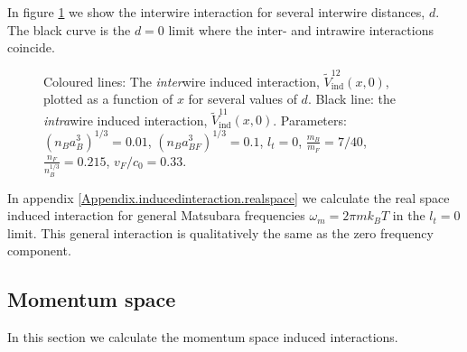 In figure \ref{fig.V12indx} we show the interwire interaction for several interwire distances, $d$. The black curve is the $d = 0$ limit where the inter- and intrawire interactions coincide. 

\begin{figure} 
\begin{center}  
  
\caption{Coloured lines: The \textit{inter}wire induced interaction, $\tilde{V}^{12}_{\text{ind}}(x, 0)$, plotted as a function of $x$ for several values of $d$. Black line: the \textit{intra}wire induced interaction, $\tilde{V}^{11}_{\text{ind}}(x, 0)$. Parameters: $(n_Ba_B^3)^{1/3} = 0.01$, $(n_Ba_{BF}^3)^{1/3} = 0.1$, $l_t = 0$, $\frac{m_B}{m_F} = 7/40$, $\frac{n_F}{n_B^{1/3}} = 0.215$, $v_F/c_0 = 0.33$.}  
\label{fig.V12indx}  
\end{center}    
\end{figure}

In appendix \ref{Appendix.inducedinteraction.realspace} we calculate the real space induced interaction for general Matsubara frequencies $\omega_m = 2\pi m k_BT$ in the $l_t = 0$ limit. This general interaction is qualitatively the same as the zero frequency component.  

\subsection{Momentum space}
\label{subsec.inducedinteraction.momentumspace}
In this section we calculate the momentum space induced interactions.

